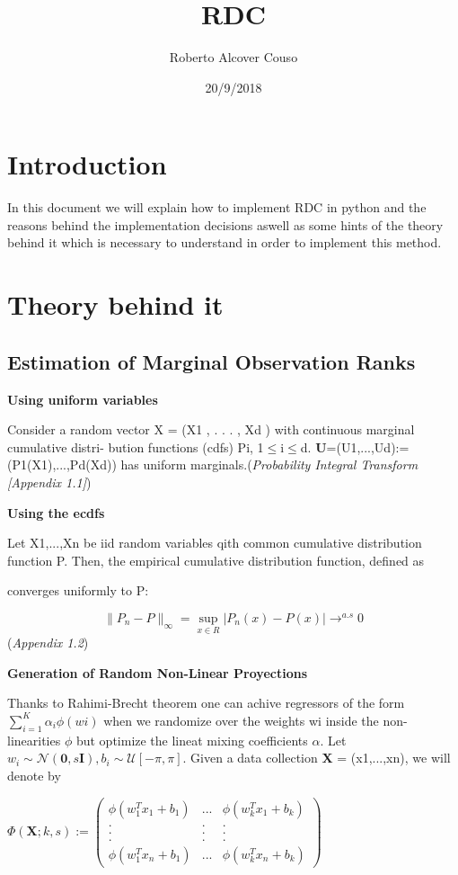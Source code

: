 \documentclass[11pt,twoside,a4paper]{article}
\begin{document}
\title{RDC}
\author{Roberto Alcover Couso}
\date{20/9/2018}
\maketitle

\section*{Introduction}
In this document we will explain how to implement RDC in python and the reasons behind the implementation decisions aswell as some hints of the theory behind it which is necessary to understand in order to implement this method.
\section*{Theory behind it}
\subsection*{Estimation of Marginal Observation Ranks}
\textbf{Using uniform variables}

Consider a random vector X = (X\small{1} , . . . , X\small{d} ) with continuous marginal cumulative distri-
bution functions (cdfs) P\small{i}, 1$\leq$i$\leq$d. 
\textbf{U}=(U\small{1},...,U\small{d}):=(P\small{1}(X\small{1}),...,P\small{d}(X\small{d})) has uniform marginals.(\textit{Probability Integral Transform [Appendix 1.1]})

\begin{flushleft}
\textbf{Using the ecdfs}

Let X\small{1},...,X\small{n} be iid random variables qith common cumulative distribution function P. Then, the empirical cumulative distribution function, defined as
\end{flushleft}
\begin{flushleft}
converges uniformly to P:
\end{flushleft}
$$\|P_{n} - P\|_{\infty}= \sup_{x \in R}|P_{n}(x) - P(x)| \rightarrow^{a.s} 0 $$
(\textit{Appendix 1.2})

\begin{flushleft}
\textbf{Generation of Random Non-Linear Proyections}

Thanks to Rahimi-Brecht theorem one can achive regressors of the form $\sum_{i=1}^{K} \alpha_{i}\phi(wi)$ when we randomize over the weights wi inside the non-linearities $\phi$ but optimize the lineat mixing coefficients $\alpha$.
Let $w_{i}\sim \mathcal{N}(\textbf{0}, s\textbf{I}), b_{i}\sim\mathcal{U}[-\pi,\pi].$
Given a data collection \textbf{X} = (x\small{1},...,x\small{n}), we will denote by
\end{flushleft}
$\Phi(\textbf{X};k,s):=
\left(\begin{array}{ccc} \phi(w_{1}^{T}x_{1} + b_{1})	&	...	&	\phi(w_{k}^{T}x_{1} + b_{k}) \\
. & . & . \\
. & . & . \\
. & . & .\\
\phi(w_{1}^{T}x_{n} + b_{1}) & ... & \phi(w_{k}^{T}x_{n} + b_{k}) \end{array}\right)$
\end{document}
